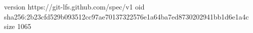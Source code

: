 version https://git-lfs.github.com/spec/v1
oid sha256:2b23cfd529b093512cc97ae70137322576e1a64ba7ed8730202941bb1d6e1a4c
size 1065
